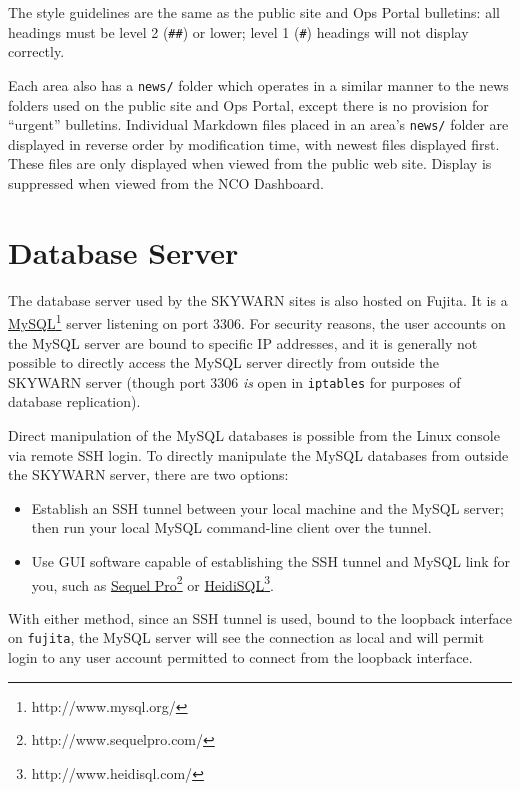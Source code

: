 \documentclass[pdflatex,letterpaper,twoside,12pt]{book}
\begin{document}
The style guidelines are the same as the public site and Ops Portal bulletins:  all headings must be level 2 (\texttt{\#\#}) or lower;  level 1 (\texttt{\#}) headings will not display correctly.

Each area also has a \texttt{news/} folder which operates in a similar manner to the news folders used on the public site and Ops Portal, except there is no provision for ``urgent'' bulletins.  Individual Markdown files placed in an area's \texttt{news/} folder are displayed in reverse order by modification time, with newest files displayed first.  These files are only displayed when viewed from the public web site.  Display is suppressed when viewed from the NCO Dashboard.


\section{Database Server}\label{database-server}

The database server used by the SKYWARN sites is also hosted on Fujita.  It is a \href{http://www.mysql.org}{MySQL}\footnote{http://www.mysql.org/} server listening on port 3306.  For security reasons, the user accounts on the MySQL server are bound to specific IP addresses, and it is generally not possible to directly access the MySQL server directly from outside the SKYWARN server (though port 3306 \emph{is} open in \texttt{iptables} for purposes of database replication).

Direct manipulation of the MySQL databases is possible from the Linux console via remote SSH login.  To directly manipulate the MySQL databases from outside the SKYWARN server, there are two options:

\begin{itemize}
\item Establish an SSH tunnel between your local machine and the MySQL server;  then run your local MySQL command-line client over the tunnel.

\item Use GUI software capable of establishing the SSH tunnel and MySQL link for you, such as \href{http://www.sequelpro.com/}{Sequel Pro}\footnote{http://www.sequelpro.com/} or \href{http://www.heidisql.com/}{HeidiSQL}\footnote{http://www.heidisql.com/}.
\end{itemize}

With either method, since an SSH tunnel is used, bound to the loopback interface on \texttt{fujita}, the MySQL server will see the connection as local and will permit login to any user account permitted to connect from the loopback interface.
\end{document}

